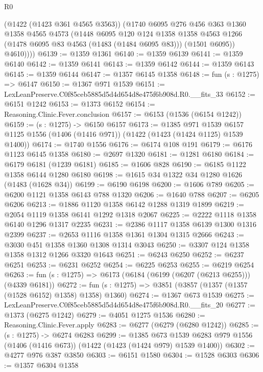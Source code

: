 \begin{lexlean}{R0}
\begin{coremodule}
          (@1422 (@1423 @361 @4565 @3563))
          (@1740
            @6095
            @276
            @456
            @363
            @1360
            @1358
            @4565
            @4573
            (@1448
              @6095
              @120
              @124
              @1358
              @1358
              @4563
              @1266
              (@1478 @6095 @83 @4563 (@1483 (@1484 @6095 @83)))
              (@1501 @6095))
            @4610))))
@6139 := @1359 @1361
@6140 := @1359 @6139
@6141 := @1359 @6140
@6142 := @1359 @6141
@6143 := @1359 @6142
@6144 := @1359 @6143
@6145 := @1359 @6144
@6147 := @1357 @6145 @1358
@6148 := fun (s : @1275) => @6147
@6150 := @1367 @971 @1539
@6151 := LexLeanPreserve.C0f85ceb5885d5d4d654d8e475f6b908d.R0.__fits_33
@6152 := @6151 @1242
@6153 := @1373 @6152
@6154 := Reasoning.Clinic.Fever.conclusion
@6157 := @6153 (@1536 (@6154 @1242))
@6159 := (s : @1275) -> @6150 @6157
@6173 := @1385
    @971
    @1539
    @6157
    @1125
    @1556
    (@1406 (@1416 @971))
    (@1422 (@1423 (@1424 @1125) @1539 @1400))
@6174 := @1740 @1556
@6176 := @6174 @108 @191
@6179 := @6176 @1123 @6145 @1358
@6180 := @2697 @1320
@6181 := @1281 @6180
@6184 := @6179 @6181 (@1239 @6181)
@6185 := @1606 @828
@6190 := @6185 @1122 @1358 @6144 @1280 @6180
@6198 := @1615 @34 @1322 @34 @1280 @1626 (@1483 (@1628 @34))
@6199 := @6190 @6198
@6200 := @1606 @789
@6205 := @6200 @1121 @1358 @6143 @788 @1320
@6206 := @1640 @788
@6207 := @6205 @6206
@6213 := @1886 @1120 @1358 @6142 @1288 @1319 @1899
@6219 := @2054 @1119 @1358 @6141 @1292 @1318 @2067
@6225 := @2222 @1118 @1358 @6140 @1296 @1317 @2235
@6231 := @2386 @1117 @1358 @6139 @1300 @1316 @2399
@6237 := @2653 @1116 @1358 @1361 @1304 @1315 @2666
@6243 := @3030 @451 @1358 @1360 @1308 @1314 @3043
@6250 := @3307 @124 @1358 @1358 @1312 @1266 @3320 @1643
@6251 := @6243 @6250
@6252 := @6237 @6251
@6253 := @6231 @6252
@6254 := @6225 @6253
@6255 := @6219 @6254
@6263 := fun (s : @1275) => @6173 (@6184 (@6199 (@6207 (@6213 @6255))) (@4339 @6181))
@6272 := fun (s : @1275) => @3851 (@3857 (@1357 (@1357 (@1528 @6152) @1358) @1358) @1360)
@6274 := @1367 @673 @1539
@6275 := LexLeanPreserve.C0f85ceb5885d5d4d654d8e475f6b908d.R0.__fits_20
@6277 := @1373 (@6275 @1242)
@6279 := @4051 @1275 @1536
@6280 := Reasoning.Clinic.Fever.apply
@6283 := @6277 (@6279 (@6280 @1242))
@6285 := (s : @1275) -> @6274 @6283
@6299 := @1385
    @673
    @1539
    @6283
    @979
    @1556
    (@1406 (@1416 @673))
    (@1422 (@1423 (@1424 @979) @1539 @1400))
@6302 := @4277 @976 @387 @3850
@6303 := @6151 @1580
@6304 := @1528 @6303
@6306 := @1357 @6304 @1358

\end{coremodule}
\end{lexlean}
